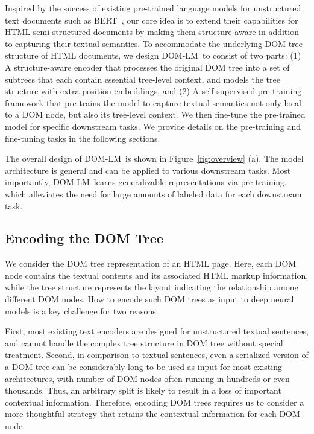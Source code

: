 \documentclass[sigconf, nonacm]{acmart}
\newcommand{\ours}[0]{DOM-LM}
\newcommand{\nop}[1]{}
\begin{document}
Inspired by the success of existing pre-trained language models for unstructured text documents such as BERT~\cite{devlin-etal-2019-bert}, our core idea is to extend their capabilities for HTML semi-structured documents by making them structure aware in addition to capturing their textual semantics.\nop{There are two main challenges to adapt BERT-like PLMs to structured HTML documents. (1) The vanilla transformer encoder in BERT is designed for plain texts, and cannot model the DOM tree structure in HTML documents. (2) PLMs such as BERT is only pre-trained on unstructured text documents, therefore unable to properly capture the tree-level context.} 
To accommodate the underlying DOM tree structure of HTML documents, we design \ours\ to consist of two parts: (1) A structure-aware encoder that processes the original DOM tree into a set of subtrees that each contain essential tree-level context, and models the tree structure with extra position embeddings, and (2) A self-supervised pre-training framework that pre-trains the model to capture textual semantics not only local to a DOM node, but also its tree-level context. We then fine-tune the pre-trained model for specific downstream tasks. We provide details on the pre-training and fine-tuning tasks in the following sections.

The overall design of \ours\ is shown in Figure~\ref{fig:overview} (a). The model architecture is general and can be applied to various downstream tasks. Most importantly, \ours\ learns generalizable representations via pre-training, which alleviates the need for large amounts of labeled data for each downstream task.

\subsection{Encoding the DOM Tree}
We consider the DOM tree representation of an HTML page. Here, each DOM node contains the textual contents and its associated HTML markup information, while the tree structure represents the layout indicating the relationship among different DOM nodes. How to encode such DOM trees as input to deep neural models is a key challenge for two reasons.

First, most existing text encoders are designed for unstructured textual sentences, and cannot handle the complex tree structure in DOM tree without special treatment. Second, in comparison to textual sentences, even a serialized version of a DOM tree can be considerably long to be used as input for most existing architectures, with number of DOM nodes often running in hundreds or even thousands. Thus, an arbitrary split is likely to result in a loss of important contextual information. Therefore, encoding DOM trees requires us to consider a more thoughtful strategy that retains the contextual information for each DOM node. 
\end{document}
